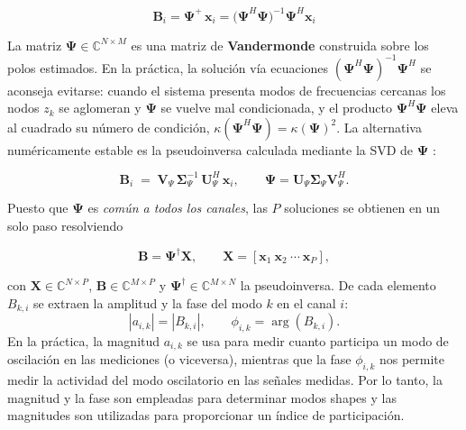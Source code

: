 \begin{equation}
\mathbf{B}_i = \boldsymbol{\Psi}^+\,\mathbf{x}_i
= \bigl(\boldsymbol{\Psi}^H\boldsymbol{\Psi}\bigr)^{-1}\boldsymbol{\Psi}^H\mathbf{x}_i
\end{equation}

La matriz $\boldsymbol{\Psi}\in\mathbb{C}^{N\times M}$ es una matriz de
\textbf{Vandermonde} construida sobre los polos estimados. En la práctica,
la solución vía ecuaciones $(\boldsymbol{\Psi}^H\boldsymbol{\Psi})^{-1}\boldsymbol{\Psi}^H$ se aconseja
evitarse: cuando el sistema presenta modos de frecuencias cercanas los nodos $z_k$ se 
aglomeran y $\boldsymbol{\Psi}$ se vuelve mal condicionada, y el producto
$\boldsymbol{\Psi}^H\boldsymbol{\Psi}$ eleva al cuadrado su número de
condición, $\kappa(\boldsymbol{\Psi}^H\boldsymbol{\Psi}) = \kappa(\boldsymbol{\Psi})^2$. La alternativa numéricamente estable es la
pseudoinversa calculada mediante la SVD de $\boldsymbol{\Psi}$
\cite{brunton2022}:

\begin{equation}
    \mathbf{B}_i \;=\;
    \mathbf{V}_{\Psi}\,\boldsymbol{\Sigma}_{\Psi}^{-1}\,
    \mathbf{U}_{\Psi}^{H}\,\mathbf{x}_i,
    \qquad
    \boldsymbol{\Psi} =
    \mathbf{U}_{\Psi}\boldsymbol{\Sigma}_{\Psi}\mathbf{V}_{\Psi}^{H}.
    \label{eq:amp_svd}
\end{equation}


Puesto que $\mathbf{\Psi}$ es \textit{común a todos los canales},
 las $P$ soluciones se obtienen en un solo paso resolviendo

\begin{equation}
\mathbf{B} = \mathbf{\Psi}^{\dagger} \mathbf{X}, \qquad
\mathbf{X} = [\mathbf{x}_1\ \mathbf{x}_2\ \cdots\ \mathbf{x}_P],
\label{eq:amplitudes_multi}
\end{equation}

con $\mathbf{X} \in \mathbb{C}^{N \times P}$, $\mathbf{B} \in \mathbb{C}^{M \times P}$ y
 $\mathbf{\Psi}^{\dagger} \in \mathbb{C}^{M \times N}$ la pseudoinversa. De cada elemento 
 $B_{k,i}$ se extraen la amplitud y la fase del modo $k$ en el canal $i$:
 \begin{equation}
|a_{i,k}| = |B_{k,i}|, \qquad
\phi_{i,k} = \arg(B_{k,i}).
\label{eq:amp_fase}
\end{equation}
En la práctica, la magnitud $a_{i,k}$ se usa para medir cuanto participa un modo de oscilación 
en las mediciones (o viceversa), mientras que la fase $\phi_{i,k}$ nos permite medir la actividad 
del modo oscilatorio en las señales medidas. Por lo tanto, la magnitud y la fase son empleadas 
para determinar modos shapes y las magnitudes son utilizadas para proporcionar un índice de    participación.



